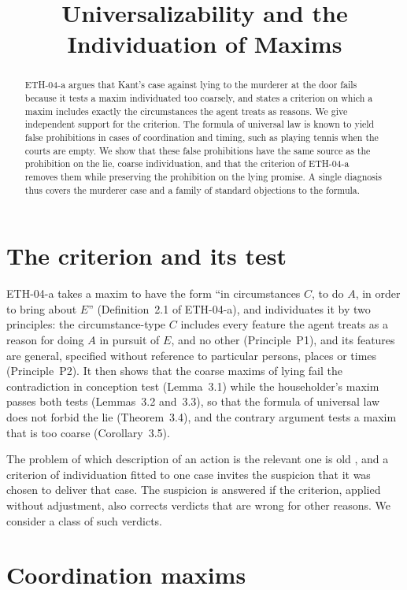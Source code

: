 \documentclass{situationist-preprint}
\title{Universalizability and the Individuation of Maxims}
\begin{document}
\maketitle

\begin{abstract}
ETH-04-a argues that Kant's case against lying to the murderer at the door fails because it tests a maxim individuated too coarsely, and states a criterion on which a maxim includes exactly the circumstances the agent treats as reasons. We give independent support for the criterion. The formula of universal law is known to yield false prohibitions in cases of coordination and timing, such as playing tennis when the courts are empty. We show that these false prohibitions have the same source as the prohibition on the lie, coarse individuation, and that the criterion of ETH-04-a removes them while preserving the prohibition on the lying promise. A single diagnosis thus covers the murderer case and a family of standard objections to the formula.
\end{abstract}

\section{The criterion and its test}

ETH-04-a takes a maxim to have the form \enquote{in circumstances $C$, to do $A$, in order to bring about $E$} (Definition~2.1 of ETH-04-a), and individuates it by two principles: the circumstance-type $C$ includes every feature the agent treats as a reason for doing $A$ in pursuit of $E$, and no other (Principle~P1), and its features are general, specified without reference to particular persons, places or times (Principle~P2). It then shows that the coarse maxims of lying fail the contradiction in conception test (Lemma~3.1) while the householder's maxim passes both tests (Lemmas~3.2 and~3.3), so that the formula of universal law does not forbid the lie (Theorem~3.4), and the contrary argument tests a maxim that is too coarse (Corollary~3.5).

The problem of which description of an action is the relevant one is old \citep{ONeill1975}, and a criterion of individuation fitted to one case invites the suspicion that it was chosen to deliver that case. The suspicion is answered if the criterion, applied without adjustment, also corrects verdicts that are wrong for other reasons. We consider a class of such verdicts.

\section{Coordination maxims}
\end{document}

